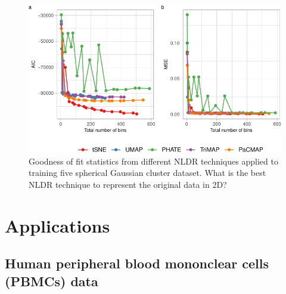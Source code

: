 \documentclass[
  12pt]{article}
\begin{document}
\begin{figure}

{\centering \includegraphics[width=1\textwidth,height=\textheight]{paper_files/figure-pdf/fig-diagnosticpltGau-1.pdf}

}

\caption{\label{fig-diagnosticpltGau}Goodness of fit statistics from
different NLDR techniques applied to training five spherical Gaussian
cluster dataset. What is the best NLDR technique to represent the
original data in 2D?}

\end{figure}

\hypertarget{sec-applications}{%
\section{Applications}\label{sec-applications}}

\hypertarget{human-peripheral-blood-mononclear-cells-pbmcs-data}{%
\subsection{Human peripheral blood mononclear cells (PBMCs)
data}\label{human-peripheral-blood-mononclear-cells-pbmcs-data}}
\end{document}

